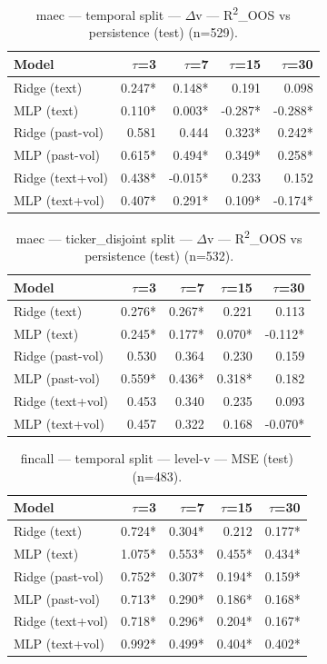 \begin{table}[t]
\centering
\begin{tabular}{lrrrr}
\toprule
Model & $\tau$=3 & $\tau$=7 & $\tau$=15 & $\tau$=30 \\
\midrule
Ridge (text) & 0.247* & 0.148* & 0.191 & 0.098 \\
MLP (text) & 0.110* & 0.003* & -0.287* & -0.288* \\
Ridge (past-vol) & 0.581 & 0.444 & 0.323* & 0.242* \\
MLP (past-vol) & 0.615* & 0.494* & 0.349* & 0.258* \\
Ridge (text+vol) & 0.438* & -0.015* & 0.233 & 0.152 \\
MLP (text+vol) & 0.407* & 0.291* & 0.109* & -0.174* \\
\bottomrule
\end{tabular}
\caption{maec — temporal split — $\Delta$v — R\textsuperscript{2}\_OOS vs persistence (test) (n=529).}
\end{table}

\begin{table}[t]
\centering
\begin{tabular}{lrrrr}
\toprule
Model & $\tau$=3 & $\tau$=7 & $\tau$=15 & $\tau$=30 \\
\midrule
Ridge (text) & 0.276* & 0.267* & 0.221 & 0.113 \\
MLP (text) & 0.245* & 0.177* & 0.070* & -0.112* \\
Ridge (past-vol) & 0.530 & 0.364 & 0.230 & 0.159 \\
MLP (past-vol) & 0.559* & 0.436* & 0.318* & 0.182 \\
Ridge (text+vol) & 0.453 & 0.340 & 0.235 & 0.093 \\
MLP (text+vol) & 0.457 & 0.322 & 0.168 & -0.070* \\
\bottomrule
\end{tabular}
\caption{maec — ticker\_disjoint split — $\Delta$v — R\textsuperscript{2}\_OOS vs persistence (test) (n=532).}
\end{table}

\begin{table}[t]
\centering
\begin{tabular}{lrrrr}
\toprule
Model & $\tau$=3 & $\tau$=7 & $\tau$=15 & $\tau$=30 \\
\midrule
Ridge (text) & 0.724* & 0.304* & 0.212 & 0.177* \\
MLP (text) & 1.075* & 0.553* & 0.455* & 0.434* \\
Ridge (past-vol) & 0.752* & 0.307* & 0.194* & 0.159* \\
MLP (past-vol) & 0.713* & 0.290* & 0.186* & 0.168* \\
Ridge (text+vol) & 0.718* & 0.296* & 0.204* & 0.167* \\
MLP (text+vol) & 0.992* & 0.499* & 0.404* & 0.402* \\
\bottomrule
\end{tabular}
\caption{fincall — temporal split — level-v — MSE (test) (n=483).}
\end{table}

